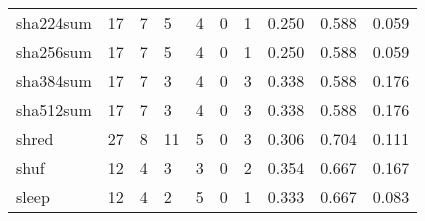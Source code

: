 \begin{longtable}{lp{2.0cm}p{2.0cm}p{2.0cm}p{2.0cm}p{2.0cm}p{2.0cm}p{2.0cm}p{2.0cm}p{2.0cm}}
sha224sum &                     17 &                                             7 &                                            5 &                                           4 &                                            0 &                                          1 &                                0.250 &                                  0.588 &                                0.059 \\
sha256sum &                     17 &                                             7 &                                            5 &                                           4 &                                            0 &                                          1 &                                0.250 &                                  0.588 &                                0.059 \\
sha384sum &                     17 &                                             7 &                                            3 &                                           4 &                                            0 &                                          3 &                                0.338 &                                  0.588 &                                0.176 \\
sha512sum &                     17 &                                             7 &                                            3 &                                           4 &                                            0 &                                          3 &                                0.338 &                                  0.588 &                                0.176 \\
shred     &                     27 &                                             8 &                                           11 &                                           5 &                                            0 &                                          3 &                                0.306 &                                  0.704 &                                0.111 \\
shuf      &                     12 &                                             4 &                                            3 &                                           3 &                                            0 &                                          2 &                                0.354 &                                  0.667 &                                0.167 \\
sleep     &                     12 &                                             4 &                                            2 &                                           5 &                                            0 &                                          1 &                                0.333 &                                  0.667 &                                0.083 \\

\end{longtable}
